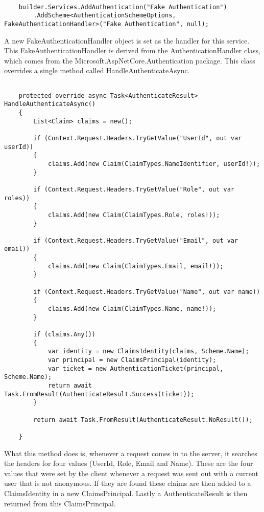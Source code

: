 \begin{verbatim}
    
    builder.Services.AddAuthentication("Fake Authentication")
        .AddScheme<AuthenticationSchemeOptions, FakeAuthenticationHandler>("Fake Authentication", null);
\end{verbatim}

A new FakeAuthenticationHandler object is set as the handler for this service. This FakeAuthenticationHandler is derived from the AuthenticationHandler class, which comes from the Microsoft.AspNetCore.Authentication package. This class overrides a single method called HandleAuthenticateAsync.

\begin{verbatim}
    
    protected override async Task<AuthenticateResult> HandleAuthenticateAsync()
    {
        List<Claim> claims = new();
        
        if (Context.Request.Headers.TryGetValue("UserId", out var userId))
        {
            claims.Add(new Claim(ClaimTypes.NameIdentifier, userId!));
        }
        
        if (Context.Request.Headers.TryGetValue("Role", out var roles))
        {
            claims.Add(new Claim(ClaimTypes.Role, roles!));
        }
        
        if (Context.Request.Headers.TryGetValue("Email", out var email))
        {
            claims.Add(new Claim(ClaimTypes.Email, email!));
        }
        
        if (Context.Request.Headers.TryGetValue("Name", out var name))
        {
            claims.Add(new Claim(ClaimTypes.Name, name!));
        }
        
        if (claims.Any())
        {
            var identity = new ClaimsIdentity(claims, Scheme.Name);
            var principal = new ClaimsPrincipal(identity);
            var ticket = new AuthenticationTicket(principal, Scheme.Name);
            return await Task.FromResult(AuthenticateResult.Success(ticket));
        }
        
        return await Task.FromResult(AuthenticateResult.NoResult());
        
    }
\end{verbatim}

What this method does is, whenever a request comes in to the server, it searches the headers for four values (UserId, Role, Email and Name). These are the four values that were set by the client whenever a request was sent out with a current user that is not anonymous. If they are found these claims are then added to a ClaimsIdentity in a new ClaimsPrincipal. Lastly a AuthenticateResult is then returned from this ClaimsPrincipal.

